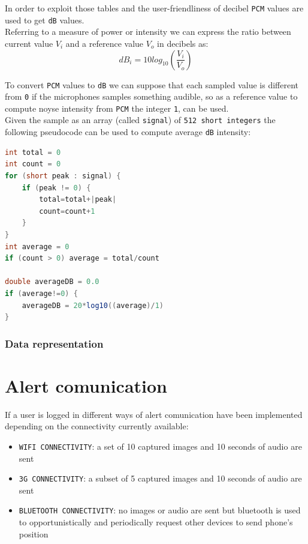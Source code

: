 \documentclass[conference]{IEEEtran}
\begin{document}
In order to exploit those tables and the user-friendliness of decibel \texttt{PCM} values are used to get \texttt{dB} values.\\ 
Referring to a measure of power or intensity we can express the ratio between current value $V_i$ and a reference value $V_o$ in decibels as:\\

\begin{equation}
dB_i = 10log_{10} \left(\frac{V_i}{V_o}\right)
\end{equation}

To convert \texttt{PCM} values to \texttt{dB} we can suppose that each sampled value is different from \texttt{0} if the microphones samples something audible, so as a reference value to compute noyse intensity from \texttt{PCM} the integer \texttt{1}, can be used.\\

Given the sample as an array (called \texttt{signal}) of \texttt{512 short integers} the following pseudocode can be used to compute average \texttt{dB} intensity:

\begin{lstlisting}[language=Java, caption=Pseudocode for computing dB from PCM samples]
int total = 0
int count = 0
for (short peak : signal) {
	if (peak != 0) {
		total=total+|peak|
		count=count+1
	}
}
int average = 0
if (count > 0) average = total/count

double averageDB = 0.0
if (average!=0) {
	averageDB = 20*log10((average)/1)
}
\end{lstlisting}

\subsubsection{\textbf{Data representation}}

\section{\textbf{Alert comunication}}
If a user is logged in different ways of alert comunication have been implemented depending on the connectivity currently available:\\
\begin{itemize}
	\item \texttt{WIFI CONNECTIVITY}: a set of 10 captured images and 10 seconds of audio are sent
	\item \texttt{3G CONNECTIVITY}: a subset of 5 captured images and 10 seconds of audio are sent
	\item \texttt{BLUETOOTH CONNECTIVITY}: no images or audio are sent but bluetooth is used to opportunistically and periodically request other devices to send phone's position
\end{itemize}
\end{document}

